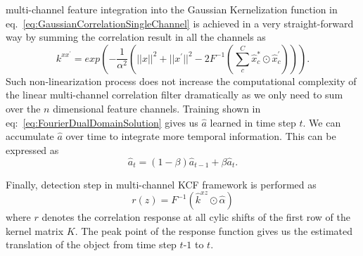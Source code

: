 \documentclass[10pt,twocolumn,letterpaper]{article}
\newcounter{ct}
\begin{document}
multi-channel feature integration into the Gaussian Kernelization
function in eq.~\ref{eq:GaussianCorrelationSingleChannel} is achieved
in a very straight-forward way by summing the correlation result in
all the channels as
\begin{equation}
k^{xx^{'}} = exp(-\dfrac{1}{\alpha^{2}}(||x||^{2}+||x^{'}||^{2}-2F^{-1}(\sum^{C}_{c}\hat{x}_{c}^{*}\odot \hat{x}_{c}^{'}))).
\label{eq:GaussianCorrelationSingleChannel}
\end{equation}
Such non-linearization process does not increase the computational
complexity of the linear multi-channel correlation filter dramatically
as we only need to sum over the $n$ dimensional feature
channels. Training shown in eq:~\ref{eq:FourierDualDomainSolution}
gives us $\hat{a}$ learned in time step $t$. We can accumulate
$\hat{a}$ over time to integrate more temporal information. This can
be expressed as
\begin{equation}
\hat{a}_{t} = (1-\beta)\hat{a}_{t-1} + \beta\hat{a}_{t}. 
\end{equation}

Finally, detection step in multi-channel KCF framework is performed as
\begin{equation}
r(z) = F^{-1}(\hat{k}^{xz} \odot \hat{\alpha})
\end{equation}
where $r$ denotes the correlation response at all cylic shifts of the
first row of the kernel matrix $K$. The peak point of the response
function gives us the estimated translation of the object from time
step $t$-$1$ to $t$.
\end{document}

